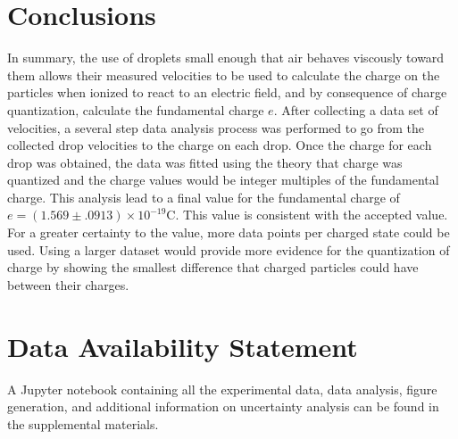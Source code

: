 \documentclass[%
 reprint,
 amsmath,amssymb,
 aps,
]{revtex4-2}
\begin{document}
\section{Conclusions}
In summary, the use of droplets small enough that air behaves viscously toward them allows their measured velocities to be used to calculate the charge on the particles when ionized to react to an electric field, and by consequence of charge quantization, calculate the fundamental charge $e$. After collecting a data set of velocities, a several step data analysis process was performed to go from the collected drop velocities to the charge on each drop. Once the charge for each drop was obtained, the data was fitted using the theory that charge was quantized and the charge values would be integer multiples of the fundamental charge. This analysis lead to a final value for the fundamental charge of  $e = (1.569 \pm .0913) \times 10^{-19} \text{C}$. This value is consistent with the accepted value.
For a greater certainty to the value, more data points per charged state could be used. Using a larger dataset would provide more evidence for the quantization of charge by showing the smallest difference that charged particles could have between their charges. 


\section*{Data Availability Statement}
A Jupyter notebook containing all the experimental data, data analysis, figure generation, and additional information on uncertainty analysis can be found in the supplemental materials. \cite{supp}

\end{document}
